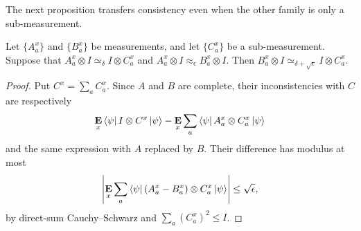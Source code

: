 \documentclass[11pt]{article}
\theoremstyle{definition}
\newcommand{\E}{\mathop{\bf E\/}}
\newcommand{\eps}{\epsilon}
\newcommand{\ot}{\otimes}
\begin{document}
The next proposition transfers consistency even when the other
family is only a sub-measurement.

\begin{proposition}
Let $\{A^x_a\}$ and $\{B^x_a\}$ be measurements,
and let $\{C^x_a\}$ be a sub-measurement.
Suppose that $A^x_a \ot I \simeq_{\delta} I \ot C^x_a$
and $A^x_a \ot I \approx_{\eps} B^x_a \ot I$.
Then $B^x_a \ot I \simeq_{\delta + \sqrt{\eps}} I \ot C^x_a$.
  \label{prop:triangle-sub}
\end{proposition}

\begin{proof}
Put $C^x=\sum_aC_a^x$.  Since $A$ and $B$ are complete, their
inconsistencies with $C$ are respectively
\[
 \E_x\bra\psi I\otimes C^x\ket\psi
 -\E_x\sum_a\bra\psi A_a^x\otimes C_a^x\ket\psi
\]
and the same expression with $A$ replaced by $B$.  Their difference
has modulus at most
\[
 \left|\E_x\sum_a\bra\psi(A_a^x-B_a^x)\otimes C_a^x\ket\psi\right|
 \leq\sqrt\eps,
\]
by direct-sum Cauchy--Schwarz and $\sum_a(C_a^x)^2\leq I$.
\end{proof}
\end{document}
